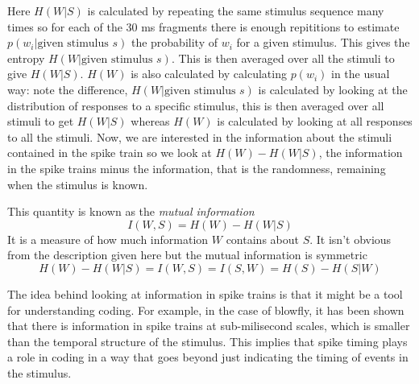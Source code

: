 \documentclass[11pt,a4paper]{scrartcl}
\begin{document}
Here $H(W|S)$ is calculated by repeating the same stimulus sequence
many times so for each of the 30 ms fragments there is enough
repititions to estimate $p(w_i|\mbox{given stimulus }s)$ the
probability of $w_i$ for a given stimulus. This gives the entropy
$H(W|\mbox{given stimulus }s)$. This is then averaged over all the
stimuli to give $H(W|S)$. $H(W)$ is also calculated by calculating
$p(w_i)$ in the usual way: note the difference, $H(W|\mbox{given
  stimulus }s)$ is calculated by looking at the distribution of
responses to a specific stimulus, this is then averaged over all
stimuli to get $H(W|S)$ whereas $H(W)$ is calculated by looking at all
responses to all the stimuli. Now, we are interested in the
information about the stimuli contained in the spike train so we look
at $H(W)-H(W|S)$, the information in the spike trains minus the
information, that is the randomness, remaining when the stimulus is
known. 

This quantity is known as the \textsl{mutual information}
\begin{equation}
I(W,S)=H(W)-H(W|S)
\end{equation}
It is a measure of how much information $W$ contains about $S$. It
isn't obvious from the description given here but the mutual information is symmetric
\begin{equation}
H(W)-H(W|S)=I(W,S)=I(S,W)=H(S)-H(S|W)
\end{equation}

The idea behind looking at information in spike trains is that it
might be a tool for understanding coding. For example, in the case of
blowfly, it has been shown that there is information in spike trains
at sub-milisecond scales, which is smaller than the temporal structure
of the stimulus. This implies that spike timing plays a role in coding
in a way that goes beyond just indicating the timing of events in the
stimulus.
\end{document}
